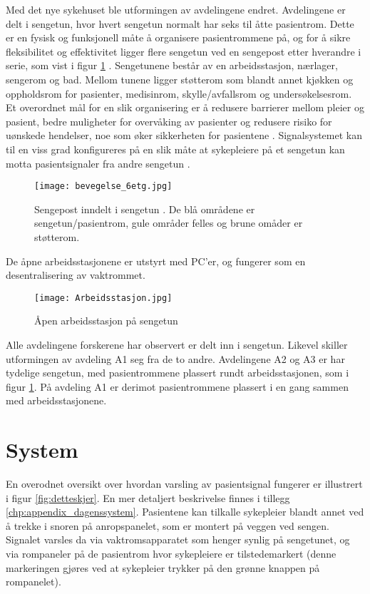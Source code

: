 \noindent
Med det nye sykehuset ble utformingen av avdelingene endret. 
Avdelingene er delt i sengetun, hvor hvert sengetun normalt har seks til åtte pasientrom. Dette er en fysisk og funksjonell måte å organisere pasientrommene på, og for å sikre fleksibilitet og effektivitet ligger flere sengetun ved en sengepost etter hverandre i serie, som vist i figur \ref{fig:sengepost} \citep{Aslaksen, sykehuskart}. Sengetunene består av en arbeidsstasjon, nærlager, sengerom og bad. Mellom tunene ligger støtterom som blandt annet kjøkken og oppholdsrom for pasienter, medisinrom, skylle/avfallsrom og undersøkelsesrom. Et overordnet mål for en slik organisering er å redusere barrierer mellom pleier og pasient, bedre muligheter for overvåking av pasienter og redusere risiko for uønskede hendelser, noe som øker sikkerheten for pasientene \citep{Sintef-sengetun}.
Signalsystemet kan til en viss grad konfigureres på en slik måte at sykepleiere på et sengetun kan motta pasientsignaler fra andre sengetun \citep{Aslaksen}. 

\begin{figure}[H]
\centering
\texttt{[image: bevegelse\_6etg.jpg]}
\caption{Sengepost inndelt i sengetun \citep{sykehuskart}. De blå områdene er sengetun/pasientrom, gule områder felles og brune omåder er støtterom.}
\label{fig:sengepost}
\end{figure}

\noindent
De åpne arbeidsstasjonene er utstyrt med PC'er, og fungerer som en desentralisering av vaktrommet. 

\begin{figure}[H]
\centering
\texttt{[image: Arbeidsstasjon.jpg]}
\caption{Åpen arbeidsstasjon på sengetun \citep{sykehuskart}}
\label{fig:arbeidsstasjon}
\end{figure}

\noindent
Alle avdelingene forskerene har observert er delt inn i sengetun. Likevel skiller utformingen av avdeling A1 seg fra de to andre.
Avdelingene A2 og A3 er har tydelige sengetun, med pasientrommene plassert rundt arbeidsstasjonen, som i figur \ref{fig:sengepost}. På avdeling A1 er derimot pasientrommene plassert i en gang sammen med arbeidsstasjonene. 


\section{System}
En overodnet oversikt over hvordan varsling av pasientsignal fungerer er illustrert i figur \ref{fig:detteskjer}. En mer detaljert beskrivelse finnes i tillegg \ref{chp:appendix_dagenssystem}.
Pasientene kan tilkalle sykepleier blandt annet ved å trekke i snoren på anropspanelet, som er montert på veggen ved sengen. Signalet varsles da via vaktromsapparatet som henger synlig på sengetunet, og via rompaneler på de pasientrom hvor sykepleiere er tilstedemarkert (denne markeringen gjøres ved at sykepleier trykker på den grønne knappen på rompanelet). 

